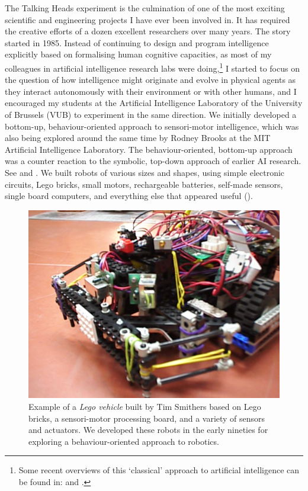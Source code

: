 The Talking Heads experiment is the culmination of one of
the most exciting scientific and engineering projects I have
ever been involved in. It has required the
creative efforts of a dozen excellent researchers 
over many years. The story started in 
1985. Instead of continuing to design and program intelligence
explicitly based on formalising human cognitive
capacities, as most of my colleagues
in artificial intelligence research 
labs were doing,\footnote{
Some recent overviews of this `classical' approach to 
artificial intelligence can be found in: \cite{Nilsson:1998} and 
\cite{Russell:1998}.}
I started to focus on the 
question of how intelligence might
originate and evolve in physical agents as they 
interact autonomously with their environment or with 
other humans, and I encouraged my students
at the Artificial Intelligence Laboratory of the University 
of Brussels (VUB) to experiment in the same direction. 
We initially developed a bottom-up, 
behaviour-oriented approach to sensori-motor intelligence, 
which was also being explored around the same time by 
Rodney Brooks at the MIT Artificial Intelligence 
Laboratory.
The behaviour-oriented, bottom-up approach  was a 
counter reaction to the symbolic, top-down approach of 
earlier AI research. See \cite{Steels:1995} and \cite{Arkin:1998}. 
We built robots of various sizes and shapes, using simple
electronic circuits, Lego bricks, small motors, rechargeable
batteries, self-made 
sensors, single board computers, and everything else that 
appeared useful (). 


\begin{figure}[htbp]
  \centerline{\includegraphics[width=.60\textwidth]{chap1/figs/robot.pdf}}
\caption{Example of a {\it Lego vehicle} built by Tim Smithers based on Lego bricks, a sensori-motor processing board, 
and a variety of 
sensors and actuators. We developed these robots in the early nineties for exploring a behaviour-oriented 
approach to robotics.}
\label{f:plate3}
\end{figure}

